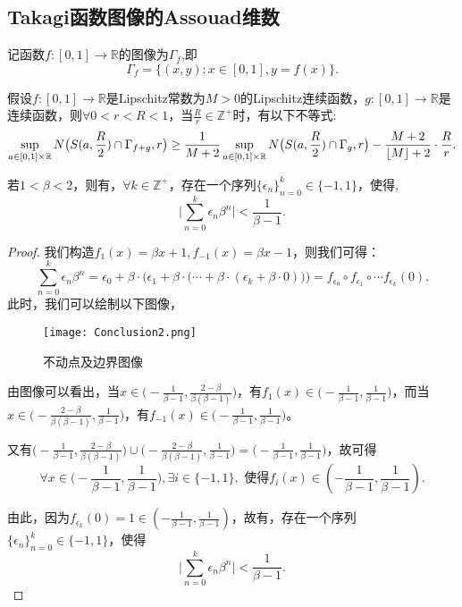 \subsection{Takagi函数图像的Assouad维数}

记函数$f:[0,1]\rightarrow\mathbb{R}$的图像为$\Gamma_f$,即
$$
      \Gamma_f=\big\{(x,y):x\in[0,1],y=f(x)\big\}.
$$


\begin{lemma}\cite{1}
      假设$f:[0,1]\rightarrow\mathbb{R}$是Lipschitz常数为$M>0$的Lipschitz连续函数，$g:[0,1]\rightarrow\mathbb{R}$是连续函数，则$\forall 0<r<R<1$，当$\frac{R}{r}\in\mathbb{Z}^+$时，有以下不等式:
      $$
            \sup\limits_{a\in[0,1]\times\mathbb{R}} N\big(S(a,\frac{R}{2})\cap \Gamma_{f+g},r\big)\\
            \ge \frac{1}{M+2}\sup\limits_{a\in[0,1]\times\mathbb{R}}N\big(S(a,\frac{R}{2})\cap\Gamma_g,r\big)-\frac{M+2}{\lfloor M\rfloor +2}\cdot \frac{R}{r}.
      $$
\end{lemma}

\begin{lemma}\cite{1}
      若$1<\beta<2$，则有，$\forall k\in\mathbb{Z}^+$，存在一个序列$\{\epsilon_n\}_{n=0}^k\in\{-1,1\}$，使得,
      $$
      \Big|\sum_{n=0}^k\epsilon_n\beta^n\Big|<\frac{1}{\beta-1}.
      $$
\end{lemma}

\begin{proof}
      我们构造$f_1(x)=\beta x+1,f_{-1}(x)=\beta x -1$，则我们可得：
      $$
      \sum_{n=0}^k\epsilon_n\beta^n=\epsilon_0+\beta\cdot\Big(\epsilon_1+\beta\cdot\big(\cdots+\beta\cdot(\epsilon_k+\beta\cdot0)\big)\Big)=f_{\epsilon_0}\circ f_{\epsilon_1}\circ \cdots f_{\epsilon_k}(0).
      $$
      此时，我们可以绘制以下图像，
      \begin{figure}[H]
            \centering
            \texttt{[image: Conclusion2.png]}
            \caption{不动点及边界图像}
            \label{fig:C1onclusion2}
      \end{figure}

      由图像可以看出，当$x\in\big(-\frac{1}{\beta-1},\frac{2-\beta}{\beta(\beta-1)}\big)$，有$f_1(x)\in\big(-\frac{1}{\beta-1},\frac{1}{\beta-1}\big)$，而当$x\in\big(-\frac{2-\beta}{\beta(\beta-1)},\frac{1}{\beta-1}\big)$，有$f_{-1}(x)\in\big(-\frac{1}{\beta-1},\frac{1}{\beta-1}\big)$。

      又有$\big(-\frac{1}{\beta-1},\frac{2-\beta}{\beta(\beta-1)}\big)\cup\big(-\frac{2-\beta}{\beta(\beta-1)},\frac{1}{\beta-1}\big)=\big(-\frac{1}{\beta-1},\frac{1}{\beta-1}\big)$，故可得
      $$
      \forall x\in\big(-\frac{1}{\beta-1},\frac{1}{\beta-1}\big), \exists i\in\{-1,1\},\mbox{ 使得}f_i(x)\in(-\frac{1}{\beta-1},\frac{1}{\beta-1}).
      $$

      由此，因为$f_{\epsilon_k}(0)=1\in(-\frac{1}{\beta-1},\frac{1}{\beta-1})$，故有，存在一个序列$\{\epsilon_n\}_{n=0}^{k}\in\{-1,1\}$，使得
      $$
      \Big|\sum_{n=0}^k\epsilon_n\beta^n\Big|<\frac{1}{\beta-1}.
      $$
\end{proof}

